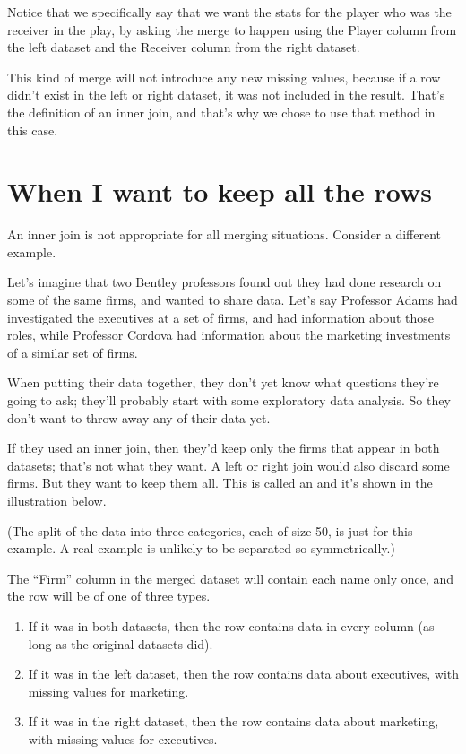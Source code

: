 \documentclass[letterpaper,10pt,english]{sphinxmanual}
\begin{document}
Notice that we specifically say that we want the stats for the player who was the receiver in the play, by asking the merge to happen using the Player column from the left dataset and the Receiver column from the right dataset.

This kind of merge will not introduce any new missing values, because if a row didn’t exist in the left or right dataset, it was not included in the result.  That’s the definition of an inner join, and that’s why we chose to use that method in this case.


\section{When I want to keep all the rows}
\label{\detokenize{chapter-12-concat-and-merge:when-i-want-to-keep-all-the-rows}}
An inner join is not appropriate for all merging situations.  Consider a different example.

Let’s imagine that two Bentley professors found out they had done research on some of the same firms, and wanted to share data.  Let’s say Professor Adams had investigated the executives at a set of firms, and had information about those roles, while Professor Cordova had information about the marketing investments of a similar set of firms.

When putting their data together, they don’t yet know what questions they’re going to ask; they’ll probably start with some exploratory data analysis.  So they don’t want to throw away any of their data yet.

If they used an inner join, then they’d keep only the firms that appear in both datasets; that’s not what they want.  A left or right join would also discard some firms.  But they want to keep them all.  This is called an  and it’s shown in the illustration below.


(The split of the data into three categories, each of size 50, is just for this example.  A real example is unlikely to be separated so symmetrically.)

The “Firm” column in the merged dataset will contain each name only once, and the row will be of one of three types.
\begin{enumerate}
%
\item {} 
If it was in both datasets, then the row contains data in every column (as long as the original datasets did).

\item {} 
If it was in the left dataset, then the row contains data about executives, with missing values for marketing.

\item {} 
If it was in the right dataset, then the row contains data about marketing, with missing values for executives.

\end{enumerate}
\end{document}

